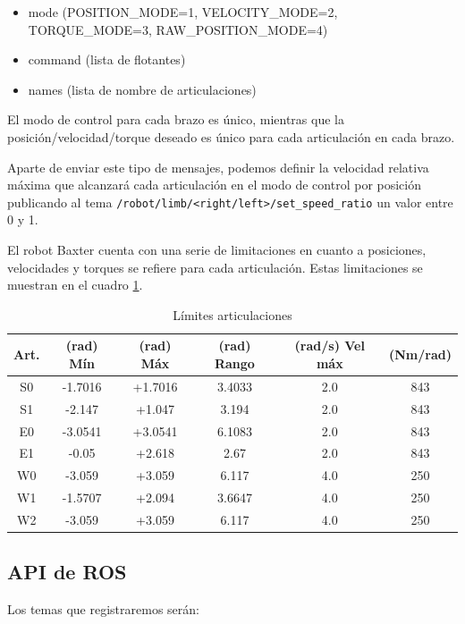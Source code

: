 \begin{itemize}
\item mode (POSITION\_MODE=1, VELOCITY\_MODE=2, TORQUE\_MODE=3, RAW\_POSITION\_MODE=4)
\item command (lista de flotantes)
\item names (lista de nombre de articulaciones)
\end{itemize}

El modo de control para cada brazo es único, mientras que la posición/velocidad/torque deseado es único para cada articulación en cada brazo.

Aparte de enviar este tipo de mensajes, podemos definir la velocidad relativa máxima que alcanzará cada articulación en el modo de control por posición publicando al tema \verb|/robot/limb/<right/left>/set_speed_ratio| un valor entre 0 y 1.

El robot Baxter cuenta con una serie de limitaciones en cuanto a posiciones, velocidades y torques se refiere para cada articulación. Estas limitaciones se muestran en el cuadro \ref{tab:desarrollo/limits}.

\begin{table}[]
\centering
\caption{Límites articulaciones}
\label{tab:desarrollo/limits}
\begin{tabular}{cccccc}
Art.                    & (rad) Mín & (rad) Máx & (rad) Rango & (rad/s) Vel máx & (Nm/rad) \\ \hline
\multicolumn{1}{c|}{S0} & -1.7016   & +1.7016   & 3.4033      & 2.0             & 843      \\
\multicolumn{1}{c|}{S1} & -2.147    & +1.047    & 3.194       & 2.0             & 843      \\
\multicolumn{1}{c|}{E0} & -3.0541   & +3.0541   & 6.1083      & 2.0             & 843      \\
\multicolumn{1}{c|}{E1} & -0.05     & +2.618    & 2.67        & 2.0             & 843      \\
\multicolumn{1}{c|}{W0} & -3.059    & +3.059    & 6.117       & 4.0             & 250      \\
\multicolumn{1}{c|}{W1} & -1.5707   & +2.094    & 3.6647      & 4.0             & 250      \\
\multicolumn{1}{c|}{W2} & -3.059    & +3.059    & 6.117       & 4.0             & 250     
\end{tabular}
\end{table}

\subsection{API de ROS}\label{sec:api-de-ros}
Los temas que registraremos serán:

